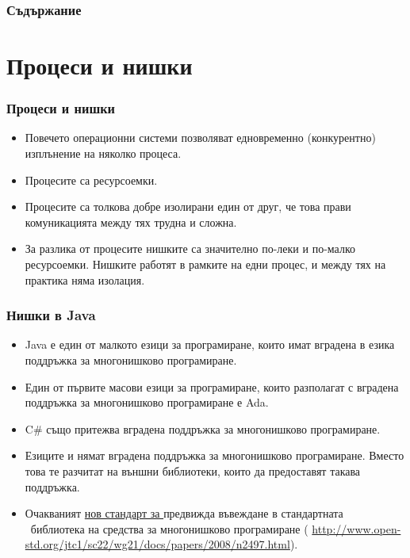 \documentclass[ignorenonframetext, hyperref=unicode,compress]{beamer}
\begin{document}
\begin{frame}
\frametitle{Съдържание}
\tableofcontents %
\end{frame}


\section{Процеси и нишки}
\begin{frame}[containsverbatim]
\frametitle{Процеси и нишки}
\begin{itemize}
\item Повечето операционни системи позволяват едновременно (конкурентно)
изплънение на няколко процеса.
\item Процесите са ресурсоемки.
\item Процесите са толкова добре изолирани един от друг, че това прави
комуникацията между тях трудна и  сложна.
\item За разлика от процесите нишките са значително по-леки и по-малко
ресурсоемки. Нишките работят в рамките на едни процес, и между тях на практика
няма изолация.
\end{itemize}
\end{frame}

\begin{frame}[containsverbatim]
\frametitle{Нишки в Java}
\begin{itemize}
\item Java е един от малкото езици за програмиране, които имат вградена
в езика поддръжка за многонишково програмиране.
\item Един от първите масови езици за програмиране,  които разполагат с
вградена поддръжка за многонишково програмиране е Ada.
\item C\# също притежва вградена поддръжка за многонишково програмиране.
\item Езиците {\CC} и {\Cpp} нямат вградена поддръжка за многонишково
програмиране. Вместо това те разчитат на външни библиотеки, които да
предоставят такава поддръжка.
\item Очакваният \href{http://en.wikipedia.org/wiki/C\%2B\%2B0x}{нов стандарт за
\Cpp} предвижда въвеждане в стандартната \Cpp\ библиотека на средства за
многонишково програмиране (%
\url{http://www.open-std.org/jtc1/sc22/wg21/docs/papers/2008/n2497.html}).
\end{itemize}
\end{frame}
\end{document}
